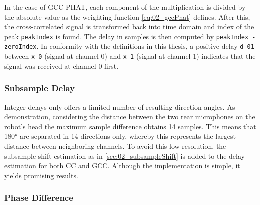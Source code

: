 In the case of \ac{GCC-PHAT}, each component of the multiplication is divided by the absolute
value as the weighting function \cref{eq:02_gccPhat} defines.
After this, the cross-correlated signal is transformed back into time domain and
index of the peak \lstinline!peakIndex! is found.
The delay in samples is then computed by \lstinline!peakIndex - zeroIndex!.
In conformity with the definitions in this thesis, a positive delay \lstinline!d_01!
between \lstinline!x_0! (signal at channel 0) and \lstinline!x_1! (signal at channel 1)
indicates that the signal was received at channel 0 first.

\subsubsection*{Subsample Delay}
\label{subsubsec:03_subsample}

Integer delays only offers a limited number of resulting direction angles.
As demonstration, considering the distance between the two rear microphones on the
robot's head the maximum sample difference obtains 14 samples.
This means that 180\si{\degree} are separated in 14 directions only, whereby
this represents the largest distance between neighboring channels.
To avoid this low resolution, the subsample shift estimation as in \cref{sec:02_subsampleShift}
is added to the delay estimation for both \ac{CC} and \ac{GCC}.
Although the implementation is simple, it yields promising results.

\subsubsection{Phase Difference}
\label{subsubsec:03_phase}


